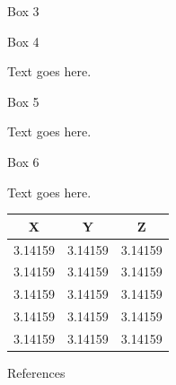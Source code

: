\documentclass[a0paper,portrait]{baposter}
\begin{document}
\begin{poster}
\begin{posterbox}[name=box3,column=1,below=box1, height=0.315]{Box 3}
\end{posterbox}





\begin{posterbox}[name=box4,column=2,below=box1, height=0.315]{Box 4}

Text goes here.



\end{posterbox}





\begin{posterbox}[name=box5,span=2,column=0,below=box2, height=0.5411]{Box 5}

Text goes here. 


\end{posterbox}





\begin{posterbox}[name=box6,column=2,below=box4, height=0.282]{Box 6}

Text goes here.

\vspace{-1.5ex}
\begin{center}
\setlength{\tabcolsep}{18pt}
\begin{tabular}{ccc}
\hline
X  & Y & Z \\
\hline
3.14159 & 3.14159 & 3.14159 \\
3.14159 & 3.14159 & 3.14159 \\
3.14159 & 3.14159 & 3.14159 \\
3.14159 & 3.14159 & 3.14159 \\
3.14159 & 3.14159 & 3.14159 \\
\hline
\end{tabular}
\label{table:tablelab}
\end{center}


\end{posterbox}




\begin{posterbox}[name=refs,column=2,below=box6, height=0.158]{References}
\vspace{-0.3em}



\end{posterbox}
\end{poster}
\end{document}
